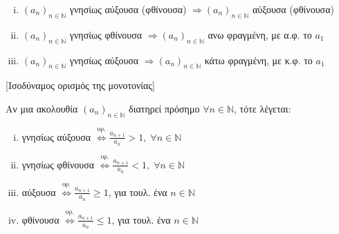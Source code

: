 \documentclass[main.tex]{subfiles}
\begin{document}
\begin{rems}
\item {}
    \begin{enumerate}[i)]
        \item $ (a_{n})_{n \in \mathbb{N}} $ γνησίως αύξουσα (φθίνουσα) $ 
            \Rightarrow (a_{n})_{n \in \mathbb{N}} $ αύξουσα (φθίνουσα) 
        \item $ (a_{n})_{n \in \mathbb{N}} $ γνησίως φθίνουσα  $ 
            \Rightarrow (a_{n})_{n \in \mathbb{N}} $ ανω φραγμένη, με 
            α.φ. το $ a_{1} $  
        \item $ (a_{n})_{n \in \mathbb{N}} $ γνησίως αύξουσα  $ 
            \Rightarrow (a_{n})_{n \in \mathbb{N}} $ κάτω φραγμένη, με 
            κ.φ. το $ a_{1} $  
    \end{enumerate}
\end{rems}

\begin{dfn}\label{dfn:isodmono}[Ισοδύναμος ορισμός της μονοτονίας]
\item {}
    Αν μια ακολουθία $ (a_{n})_{n \in \mathbb{N}} $ διατηρεί πρόσημο 
    $ \forall n \in \mathbb{N} $, τότε λέγεται:
    \begin{enumerate}[i)]
        \item γνησίως αύξουσα $ \overset{\text{ορ.}}{\Leftrightarrow} 
            \frac{a_{n+1}}{a_{n}} > 1, \; \forall n \in \mathbb{N}$
        \item γνησίως φθίνουσα $ \overset{\text{ορ.}}{\Leftrightarrow} 
            \frac{a_{n+1}}{a_{n}} < 1, \; \forall n \in \mathbb{N}$
        \item  αύξουσα $ \overset{\text{ορ.}}{\Leftrightarrow} 
            \frac{a_{n+1}}{a_{n}} \geq 1 $, για τουλ. ένα $ n \in \mathbb{N} $
        \item  φθίνουσα $ \overset{\text{ορ.}}{\Leftrightarrow} 
            \frac{a_{n+1}}{a_{n}} \leq 1 $, για τουλ. ένα $ n \in \mathbb{N} $
    \end{enumerate}
\end{dfn}
\end{document}
